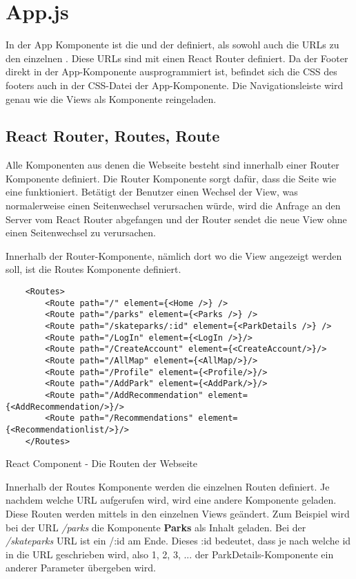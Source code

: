\section{App.js}
\label{appDatei}

In der App Komponente ist die \underline{} und der \underline{} definiert, 
als sowohl auch die URLs zu den einzelnen \underline{}. Diese URLs sind mit einen React 
Router definiert. Da der Footer direkt in der App-Komponente ausprogrammiert ist, 
befindet sich die CSS des footers auch in der CSS-Datei der App-Komponente. Die Navigationsleiste wird genau 
wie die Views als Komponente reingeladen.

\subsection{React Router, Routes, Route}
Alle Komponenten aus denen die Webseite besteht sind innerhalb einer Router Komponente definiert. Die 
Router Komponente sorgt dafür, dass die Seite wie eine \underline{} funktioniert. Betätigt
der Benutzer einen Wechsel der View, was normalerweise einen Seitenwechsel verursachen würde, wird die 
Anfrage an den Server vom React Router abgefangen und der Router sendet die neue View ohne einen 
Seitenwechsel zu verursachen. 

\newpage
Innerhalb der Router-Komponente, nämlich dort wo die View angezeigt werden soll, ist die Routes
Komponente definiert.
\begin{code}[htp]
\begin{lstlisting}
    <Routes>
        <Route path="/" element={<Home />} />
        <Route path="/parks" element={<Parks />} />
        <Route path="/skateparks/:id" element={<ParkDetails />} />
        <Route path="/LogIn" element={<LogIn />}/>
        <Route path="/CreateAccount" element={<CreateAccount/>}/>
        <Route path="/AllMap" element={<AllMap/>}/>
        <Route path="/Profile" element={<Profile/>}/>
        <Route path="/AddPark" element={<AddPark/>}/>
        <Route path="/AddRecommendation" element={<AddRecommendation/>}/>
        <Route path="/Recommendations" element={<Recommendationlist/>}/>
    </Routes>
\end{lstlisting} 
\caption{React Component - Die Routen der Webseite}
\end{code}
Innerhalb der Routes Komponente werden die einzelnen Routen definiert. Je nachdem welche URL aufgerufen wird,
wird eine andere Komponente geladen. Diese Routen werden mittels \underline{} in den einzelnen 
Views geändert. Zum Beispiel wird bei der URL \textit{/parks} die Komponente \textbf{Parks} als 
Inhalt geladen. Bei der \textit{/skateparks} URL ist ein /:id am Ende. Dieses :id 
bedeutet, dass je nach welche id in die URL geschrieben wird, also 1, 2, 3, ... der 
ParkDetails-Komponente ein anderer Parameter übergeben wird. 

